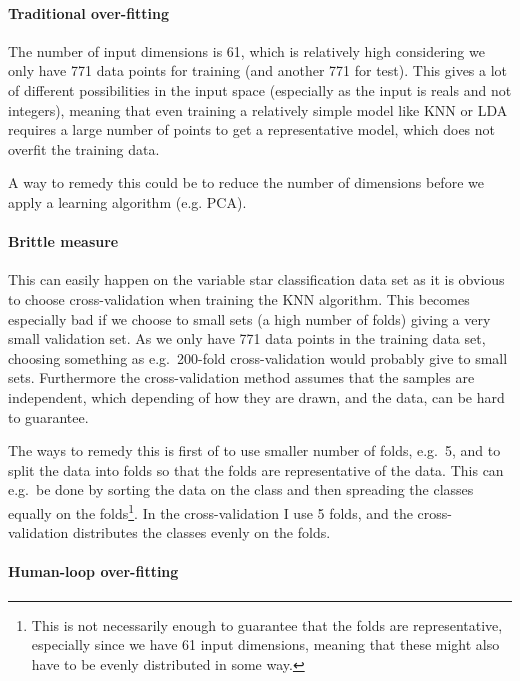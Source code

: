 \documentclass[a4paper, 11pt]{article}
\begin{document}
\paragraph{Traditional over-fitting} %
\label{par:traditional_over_fitting}

The number of input dimensions is 61, which is relatively high considering we only have 771 data points for training (and another 771 for test). This gives a lot of different possibilities in the input space (especially as the input is reals and not integers), meaning that even training a relatively simple model like KNN or LDA requires a large number of points to get a representative model, which does not overfit the training data.

A way to remedy this could be to reduce the number of dimensions before we apply a learning algorithm (e.g. PCA).


\paragraph{Brittle measure} %
\label{par:brittle_measure}

This can easily happen on the variable star classification data set as it is obvious to choose cross-validation when training the KNN algorithm. This becomes especially bad if we choose to small sets (a high number of folds) giving a very small validation set. As we only have 771 data points in the training data set, choosing something as e.g.\ 200-fold cross-validation would probably give to small sets. Furthermore the cross-validation method assumes that the samples are independent, which depending of how they are drawn, and the data, can be hard to guarantee.

The ways to remedy this is first of to use smaller number of folds, e.g.\ 5, and to split the data into folds so that the folds are representative of the data. This can e.g.\ be done by sorting the data on the class and then spreading the classes equally on the folds\footnote{This is not necessarily enough to guarantee that the folds are representative, especially since we have 61 input dimensions, meaning that these might also have to be evenly distributed in some way.}. In the cross-validation I use 5 folds, and the cross-validation distributes the classes evenly on the folds.


\paragraph{Human-loop over-fitting} %
\label{par:human_loop_over_fitting}
\end{document}
